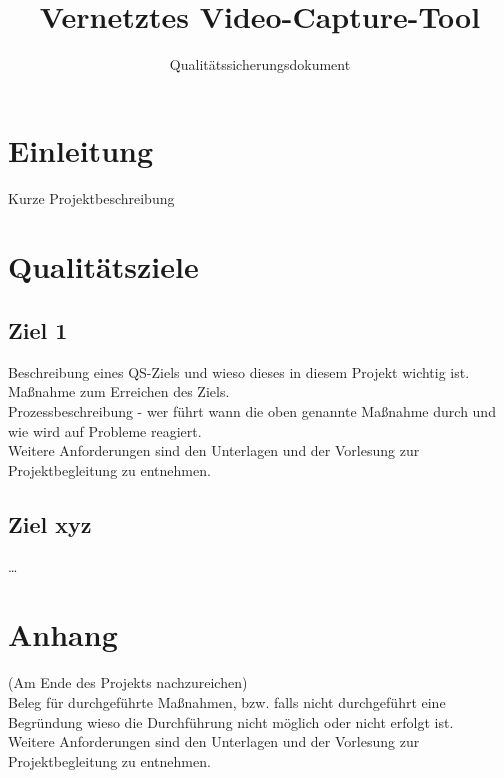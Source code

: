 \documentclass[accentcolor=tud0b,12pt,paper=a4]{tudreport}
\title{Vernetztes Video-Capture-Tool}
\subtitle{Qualitätssicherungsdokument}
\begin{document}
	\maketitle
	\tableofcontents 
	
	\chapter{Einleitung}
		Kurze Projektbeschreibung
	
	\chapter{Qualitätsziele}
        \section{Ziel 1}
    
		Beschreibung eines QS-Ziels und wieso dieses in diesem Projekt wichtig ist.\\
		Maßnahme zum Erreichen des Ziels.\\
		Prozessbeschreibung - wer führt wann die oben genannte Maßnahme durch und wie wird auf Probleme reagiert.\\
		Weitere Anforderungen sind den Unterlagen und der Vorlesung zur Projektbegleitung zu entnehmen.

        \section{Ziel xyz}
	        \ldots
	        
	
\appendix	
	\chapter{Anhang}
		(Am Ende des Projekts nachzureichen)\\
		Beleg für durchgeführte Maßnahmen, bzw. falls nicht durchgeführt eine Begründung wieso die Durchführung nicht möglich oder nicht erfolgt ist. \\
		Weitere Anforderungen sind den Unterlagen und der Vorlesung zur Projektbegleitung zu entnehmen.
	
\end{document}
